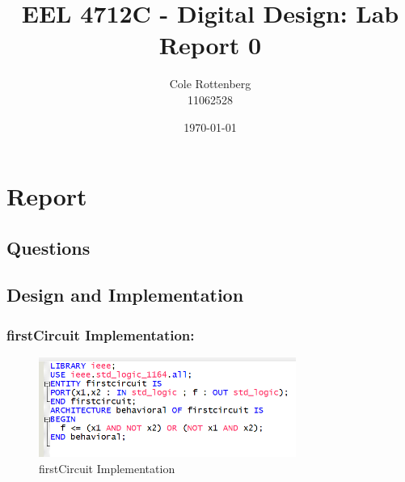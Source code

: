 \documentclass{article}
\title{EEL 4712C - Digital Design: Lab Report 0}
\author{Cole Rottenberg \\ 11062528}
\date{\today}
\begin{document}
\maketitle

\section*{Report}

\subsection*{Questions}

\subsection*{Design and Implementation}
\subsubsection*{firstCircuit Implementation:}
\begin{figure}[h]
  \centering
  \includegraphics[width=0.75\textwidth]{code.png}
  \caption{firstCircuit Implementation}
\end{figure}
\end{document}
